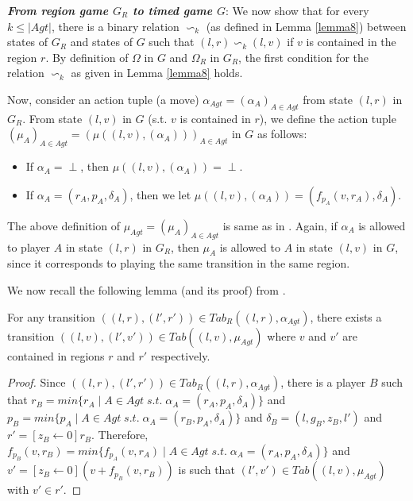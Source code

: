 \textbf{\textit{From region game $G_{R}$ to timed game $G$}}: We now show that for every $k \leq \vert Agt \vert$, there is a binary relation $\backsim_{k}$ (as defined in Lemma \ref{lemma8}) between states of $G_{R}$ and states of $G$ such that $(l, r) \backsim_{k} (l, v)$ if $v$ is contained in the region $r$. By definition of $\Omega$ in $G$ and $\Omega_{R}$ in $G_{R}$, the first condition for the relation $\backsim_{k}$ as given in Lemma \ref{lemma8} holds.

Now, consider an action tuple (a move) $\alpha_{Agt} = (\alpha_{A})_{A\in Agt}$ from state $(l, r)$ in $G_{R}$. From state $(l, v)$ in $G$ (s.t. $v$ is contained in $r$), we define the action tuple $(\mu_{A})_{A\in Agt} = (\mu((l, v), (\alpha_{A})))_{A\in Agt}$ in $G$ as follows:
\begin{itemize}
\item If $\alpha_{A} = \perp$, then $\mu((l, v), (\alpha_{A})) = \perp$.
\item If $\alpha_{A} = (r_{A}, p_{A}, \delta_{A})$, then we let $\mu((l, v), (\alpha_{A})) = (f_{p_{A}}(v, r_{A}), \delta_{A})$.
\end{itemize}

The above definition of $\mu_{Agt} = (\mu_{A})_{A\in Agt}$ is same as in \cite{BBM-concur10,BBM-report}. Again, if $\alpha_{A}$ is allowed to player $A$ in state $(l, r)$ in $G_{R}$, then $\mu_{A}$ is allowed to $A$ in state $(l, v)$ in $G$, since it corresponds to playing the same transition in the same region.

We now recall the following lemma (and its proof) from \cite{BBM-report}.

\begin{lemma}
\label{lemma11}
For any transition $((l, r), (l', r')) \in Tab_{R}((l, r), \alpha_{Agt})$, there exists a transition $((l, v), (l', v')) \in Tab((l, v), \mu_{Agt})$ where $v$ and $v'$ are contained in regions $r$ and $r'$ respectively.
\end{lemma}

\begin{proof}
Since $((l, r), (l', r')) \in Tab_{R}((l, r), \alpha_{Agt})$, there is a player $B$ such that $r_{B} = min\lbrace r_{A} \; \vert \; A \in Agt \; s.t. \; \alpha_{A} = (r_{A}, p_{A}, \delta_{A}) \rbrace$ and $p_{B} = min\lbrace p_{A} \; \vert \; A \in Agt \; s.t. \; \alpha_{A} = (r_{B}, p_{A}, \delta_{A}) \rbrace$ and $\delta_{B} = (l, g_{B}, z_{B}, l')$ and $r' = [z_{B} \leftarrow 0]r_{B}$. Therefore, $f_{p_{B}}(v, r_{B}) = min\lbrace f_{p_{A}}(v, r_{A}) \; \vert \; A \in Agt \; s.t. \; \alpha_{A} = (r_{A}, p_{A}, \delta_{A}) \rbrace$ and $v' = [z_{B} \leftarrow 0](v + f_{p_{B}}(v, r_{B}))$ is such that $(l', v') \in Tab((l, v), \mu_{Agt})$ with $v' \in r'$.
\end{proof}

